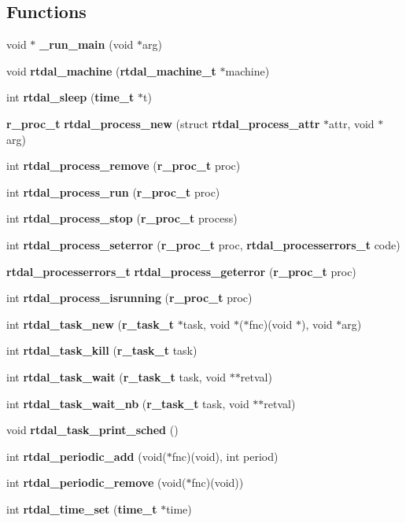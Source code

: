 \subsection*{Functions}
\begin{DoxyCompactItemize}
\item 
void $\ast$ {\bf \-\_\-run\-\_\-main} (void $\ast$arg)
\item 
void {\bf rtdal\-\_\-machine} ({\bf rtdal\-\_\-machine\-\_\-t} $\ast$machine)
\item 
int {\bf rtdal\-\_\-sleep} ({\bf time\-\_\-t} $\ast$t)
\item 
{\bf r\-\_\-proc\-\_\-t} {\bf rtdal\-\_\-process\-\_\-new} (struct {\bf rtdal\-\_\-process\-\_\-attr} $\ast$attr, void $\ast$arg)
\item 
int {\bf rtdal\-\_\-process\-\_\-remove} ({\bf r\-\_\-proc\-\_\-t} proc)
\item 
int {\bf rtdal\-\_\-process\-\_\-run} ({\bf r\-\_\-proc\-\_\-t} proc)
\item 
int {\bf rtdal\-\_\-process\-\_\-stop} ({\bf r\-\_\-proc\-\_\-t} process)
\item 
int {\bf rtdal\-\_\-process\-\_\-seterror} ({\bf r\-\_\-proc\-\_\-t} proc, {\bf rtdal\-\_\-processerrors\-\_\-t} code)
\item 
{\bf rtdal\-\_\-processerrors\-\_\-t} {\bf rtdal\-\_\-process\-\_\-geterror} ({\bf r\-\_\-proc\-\_\-t} proc)
\item 
int {\bf rtdal\-\_\-process\-\_\-isrunning} ({\bf r\-\_\-proc\-\_\-t} proc)
\item 
int {\bf rtdal\-\_\-task\-\_\-new} ({\bf r\-\_\-task\-\_\-t} $\ast$task, void $\ast$($\ast$fnc)(void $\ast$), void $\ast$arg)
\item 
int {\bf rtdal\-\_\-task\-\_\-kill} ({\bf r\-\_\-task\-\_\-t} task)
\item 
int {\bf rtdal\-\_\-task\-\_\-wait} ({\bf r\-\_\-task\-\_\-t} task, void $\ast$$\ast$retval)
\item 
int {\bf rtdal\-\_\-task\-\_\-wait\-\_\-nb} ({\bf r\-\_\-task\-\_\-t} task, void $\ast$$\ast$retval)
\item 
void {\bf rtdal\-\_\-task\-\_\-print\-\_\-sched} ()
\item 
int {\bf rtdal\-\_\-periodic\-\_\-add} (void($\ast$fnc)(void), int period)
\item 
int {\bf rtdal\-\_\-periodic\-\_\-remove} (void($\ast$fnc)(void))
\item 
int {\bf rtdal\-\_\-time\-\_\-set} ({\bf time\-\_\-t} $\ast$time)
\item 

\end{DoxyCompactItemize}
